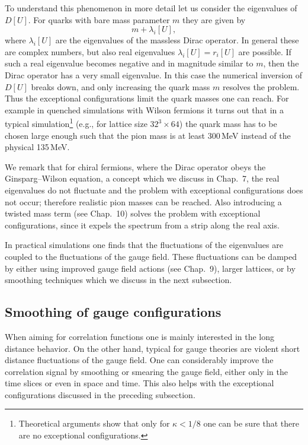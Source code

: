 To understand this phenomenon in more detail let us consider the eigenvalues of
$D[U]$. For quarks with bare mass parameter $m$ they are given by
\begin{equation}
  m + \lambda_i[U] ,
\end{equation}
where $\lambda_i[U]$ are the eigenvalues of the massless Dirac operator. In
general these are complex numbers, but also real eigenvalues
$\lambda_i[U] = r_i[U]$ are possible. If such a real eigenvalue becomes
negative and in magnitude similar to $m$, then the Dirac operator has a very
small eigenvalue. In this case the numerical inversion of $D[U]$ breaks down,
and only increasing the quark mass $m$ resolves the problem. Thus the
exceptional configurations limit the quark masses one can reach. For example in
quenched simulations with Wilson fermions it turns out that in a typical
simulation\footnote{Theoretical arguments show that only for $\kappa < 1/8$ one
can be sure that there are no exceptional configurations.} (e.g., for lattice
size $32^3 \times 64$) the quark mass has to be chosen large enough such that
the pion mass is at least 300\,MeV instead of the physical 135\,MeV.

We remark that for chiral fermions, where the Dirac operator obeys the
Ginsparg--Wilson equation, a concept which we discuss in Chap.~7, the real
eigenvalues do not fluctuate and the problem with exceptional configurations
does not occur; therefore realistic pion masses can be reached. Also
introducing a twisted mass term (see Chap.~10) solves the problem with
exceptional configurations, since it expels the spectrum from a strip along the
real axis.

In practical simulations one finds that the fluctuations of the eigenvalues are
coupled to the fluctuations of the gauge field. These fluctuations can be
damped by either using improved gauge field actions (see Chap.~9), larger
lattices, or by smoothing techniques which we discuss in the next subsection.

\subsection{Smoothing of gauge configurations}

When aiming for correlation functions one is mainly interested in the long
distance behavior. On the other hand, typical for gauge theories are violent
short distance fluctuations of the gauge field. One can considerably improve
the correlation signal by smoothing or smearing the gauge field, either only in
the time slices or even in space and time. This also helps with the exceptional
configurations discussed in the preceding subsection.

